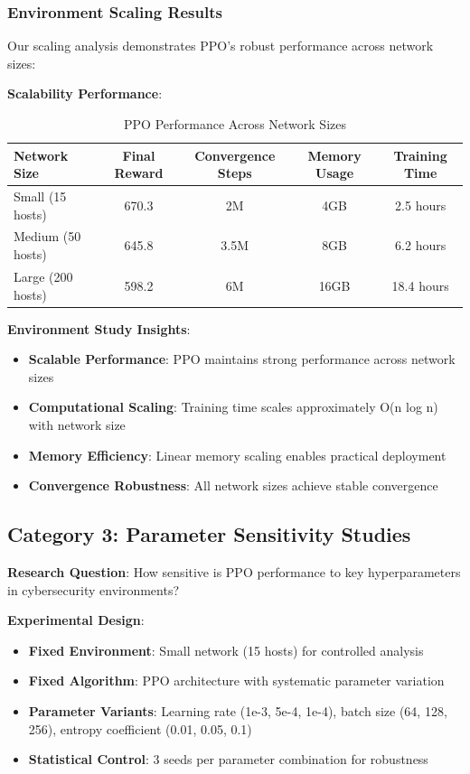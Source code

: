 \documentclass[12pt,twoside]{article}
\theoremstyle{definition}
\theoremstyle{plain}
\begin{document}
\subsubsection{Environment Scaling Results}

Our scaling analysis demonstrates PPO's robust performance across network sizes:

\textbf{Scalability Performance}:
\begin{table}[H]
\centering
\caption{PPO Performance Across Network Sizes}
\begin{tabular}{|l|c|c|c|c|}
\hline
\textbf{Network Size} & \textbf{Final Reward} & \textbf{Convergence Steps} & \textbf{Memory Usage} & \textbf{Training Time} \\
\hline
Small (15 hosts) & 670.3 & 2M & 4GB & 2.5 hours \\
Medium (50 hosts) & 645.8 & 3.5M & 8GB & 6.2 hours \\  
Large (200 hosts) & 598.2 & 6M & 16GB & 18.4 hours \\
\hline
\end{tabular}
\end{table}

\textbf{Environment Study Insights}:
\begin{itemize}
\item \textbf{Scalable Performance}: PPO maintains strong performance across network sizes
\item \textbf{Computational Scaling}: Training time scales approximately O(n log n) with network size
\item \textbf{Memory Efficiency}: Linear memory scaling enables practical deployment
\item \textbf{Convergence Robustness}: All network sizes achieve stable convergence
\end{itemize}

\subsection{Category 3: Parameter Sensitivity Studies}

\textbf{Research Question}: How sensitive is PPO performance to key hyperparameters in cybersecurity environments?

\textbf{Experimental Design}:
\begin{itemize}
\item \textbf{Fixed Environment}: Small network (15 hosts) for controlled analysis
\item \textbf{Fixed Algorithm}: PPO architecture with systematic parameter variation
\item \textbf{Parameter Variants}: Learning rate (1e-3, 5e-4, 1e-4), batch size (64, 128, 256), entropy coefficient (0.01, 0.05, 0.1)
\item \textbf{Statistical Control}: 3 seeds per parameter combination for robustness
\end{itemize}
\end{document}
